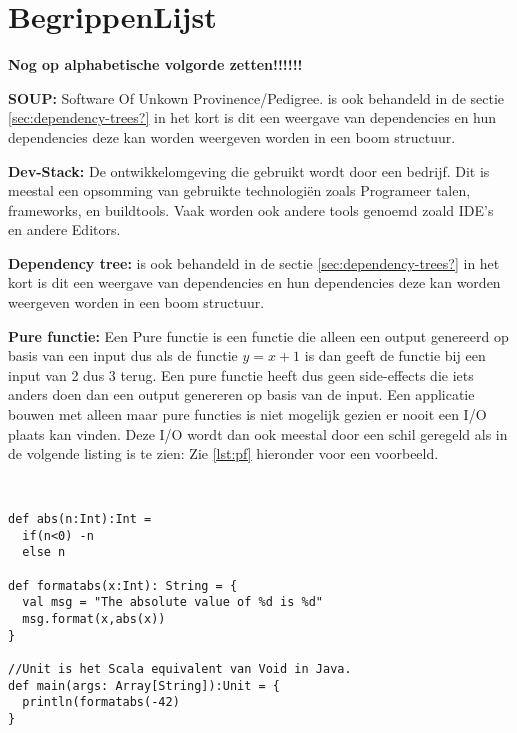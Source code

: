 
\chapter{BegrippenLijst}\label{ch:begrippenlijst}





\textbf{Nog op alphabetische volgorde zetten!!!!!!}

\textbf{SOUP: } Software Of Unkown Provinence/Pedigree. is ook behandeld in de sectie \ref{sec:dependency-trees?} in het kort is dit een weergave van dependencies en hun dependencies deze kan worden weergeven worden in een boom structuur.
\smallskip

\textbf{Dev-Stack: } De ontwikkelomgeving die gebruikt wordt door een bedrijf. Dit is meestal een opsomming van gebruikte technologiën zoals Programeer talen, frameworks, en buildtools. Vaak worden ook andere tools genoemd zoald IDE's en andere Editors.
\smallskip


\smallskip
\textbf{Dependency tree: } is ook behandeld in de sectie \ref{sec:dependency-trees?} in het kort is dit een weergave van dependencies en hun dependencies deze kan worden weergeven worden in een boom structuur.
\smallskip

\textbf{Pure functie: }
Een Pure functie is een functie die alleen een output genereerd op basis van een input dus als de functie \( y = x+1\) is dan geeft de functie bij een input van 2 dus 3 terug.
Een pure functie heeft dus geen side-effects die iets anders doen dan een output genereren op basis van de input.
Een applicatie bouwen met alleen maar pure functies is niet mogelijk gezien er nooit een I/O plaats kan vinden.
Deze I/O wordt dan ook meestal door een schil geregeld als in de volgende listing is te zien:
Zie \autoref{lst:pf} hieronder voor een voorbeeld.

\begin{lstlisting}[caption={Pure functie met IO},label=lst:pf]


def abs(n:Int):Int =
  if(n<0) -n
  else n

def formatabs(x:Int): String = {
  val msg = "The absolute value of %d is %d"
  msg.format(x,abs(x))
}

//Unit is het Scala equivalent van Void in Java.
def main(args: Array[String]):Unit = {
  println(formatabs(-42)
}
\end{lstlisting}

